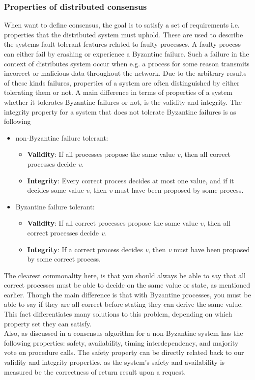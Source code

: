 \subsubsection{Properties of distributed consensus}
When want to define consensus, the goal is to satisfy a set of requirements i.e. properties that the distributed system must uphold. These are used to describe the systems fault tolerant features related to faulty processes. A faulty process can either fail by crashing or experience a Byzantine failure. Such a failure in the context of distributes system occur when e.g. a process for some reason transmits incorrect or malicious data throughout the network. Due to the arbitrary results of these kinds failures, properties of a system are often distinguished by either tolerating them or not. A main difference in terms of properties of a system whether it tolerates Byzantine failures or not, is the validity and integrity. The integrity property for a system that does not tolerate Byzantine failures is as following\cite{Distributed Systems}
\begin{itemize}
\item non-Byzantine failure tolerant:
	\begin{itemize}
	\item \textbf{Validity}: If all processes propose the same value \textit{v}, then all correct processes decide \textit{v}.
	\item \textbf{Integrity}: Every correct process decides at most one value, and if it decides some value \textit{v}, then \textit{v} must have been proposed by some process.
	\end{itemize}
\item Byzantine failure tolerant:
	\begin{itemize}
	\item \textbf{Validity}: If all correct processes propose the same value \textit{v}, then all correct processes decide \textit{v}.
	\item \textbf{Integrity}: If a correct process decides \textit{v}, then \textit{v} must have been proposed by some correct process.
	\end{itemize}
\end{itemize}
The clearest commonality here, is that you should always be able to say that all correct processes must be able to decide on the same value or state, as mentioned earlier. Though the main difference is that with Byzantine processes, you must be able to say if they are all correct before stating they can derive the same value. This fact differentiates many solutions to this problem, depending on which property set they can satisfy. \\
Also, as discussed in \cite{Raft} a consensus algorithm for a non-Byzantine system has the following properties: safety, availability, timing interdependency, and majority vote on procedure calls. The safety property can be directly related back to our validity and integrity properties, as the system's safety and availability is measured be the correctness of return result upon a request.
